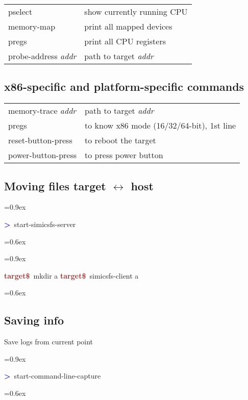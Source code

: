 \documentclass[8pt]{extarticle}
\newenvironment{code}[1][]{%
\begin{prebox}[#1]\obeylines%
\fontdimen2\font=0.9ex%
}{%
\end{prebox}%
\fontdimen2\font=0.6ex%
}
\newcommand{\tprompt}{\textcolor{brown}{\textbf{target\$}\ }}
\newcommand{\sprompt}{\textcolor{blue}{\textbf{>}\ }}
\newcommand{\p}[1]{\textit{\large#1}}
\begin{document}
\begin{multicols*}{3}
\begin{tabular}{ll}
    pselect & show currently running CPU \\
    memory-map & print all mapped devices \\
    pregs & print all CPU registers \\
    probe-address \p{addr} & path to target \p{addr}
\end{tabular}

\subsection{x86-specific and platform-specific commands}

\begin{tabular}{ll}
    memory-trace \p{addr} & path to target \p{addr} \\
    pregs & to know x86 mode (16/32/64-bit), 1st line \\
    reset-button-press & to reboot the target \\
    power-button-press & to press power button \\
\end{tabular}

\subsection{Moving files target \texorpdfstring{$\longleftrightarrow$}{<->} host}
\begin{code}
\sprompt start-simicsfs-server
\end{code}

\begin{code}[colback=blue!15]
\tprompt mkdir a
\tprompt simicsfs-client a
\end{code}

\subsection{Saving info}
Save logs from current point
\begin{code}
\sprompt start-command-line-capture
\end{code}


\end{multicols*}
\end{document}
